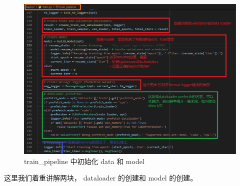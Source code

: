 \documentclass[../main.tex]{subfiles}
\begin{document}
\begin{figure}[h]
    \begin{center}
        \vspace{-0.2cm}
        \includegraphics[width=0.9\linewidth]{figures/getting_start_init_data_model.png}
        \vspace{-0.3cm}
        \caption{train\_pipeline 中初始化 data 和 model}
        \label{fig:getting_start_init_data_model}
    \end{center}
    \vspace{-0.5cm}
\end{figure}

这里我们着重讲解两块， dataloader 的创建和 model 的创建。
\end{document}
